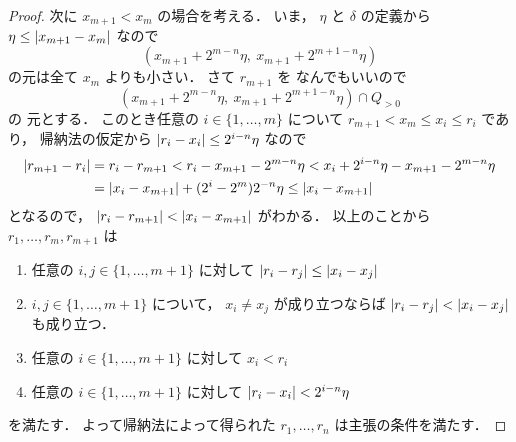 \documentclass[leqno, 12pt]{jsarticle}
\DeclarePairedDelimiter{\abs}{\lvert}{\rvert}
\newcommand{\pospart}[1]{#1_{>0}}
\begin{document}
\begin{proof}
次に%
$x_{m+1}<x_{m}$
の場合を考える．
いま，
$\eta$
と
$\delta$
の定義から
$\eta\le\abs{x_{m+1}-x_{m}}$
なので
\[
(x_{m+1}+2^{m-n}\eta, \  x_{m+1}+2^{m+1-n}\eta)
\]
の元は全て
$x_{m}$
よりも小さい．
さて
$r_{m+1}$
を
なんでもいいので
\[
(x_{m+1}+2^{m-n}\eta, \  x_{m+1}+2^{m+1-n}\eta)\cap \pospart{Q}
\]
の
元とする．
このとき任意の
$i\in \{1, \dots, m\}$
について
$r_{m+1}<x_{m}\le x_{i}\le r_{i}$
であり，
帰納法の仮定から
$\abs{r_{i}-x_{i}}\le 2^{i-n}\eta$
なので
\begin{align*}
\abs{r_{m+1}-r_{i}}
&=
r_{i}-r_{m+1}
< r_{i} - x_{m+1}-2^{m-n}\eta
< x_{i}+2^{i-n}\eta-x_{m+1}-2^{m-n}\eta\\
&=\abs{x_{i}-x_{m+1}}+(2^i-2^{m})2^{-n}\eta
\le \abs{x_{i}-x_{m+1}}
\end{align*}
となるので，
$\abs{r_{i}-r_{m+1}}<\abs{x_{i}-x_{m+1}}$
がわかる．
以上のことから
$r_{1}, \dots, r_{m}, r_{m+1}$
は
\begin{enumerate}[label=\textup{(\arabic*)}]
\item
任意の
$i, j\in \{1, \dots, m+1\}$
に対して
$\abs{r_{i}-r_{j}}\le \abs{x_{i}-x_{j}}$
\item
$i, j\in \{1, \dots, m+1\}$
について，
$x_{i}\neq x_{j}$%
が成り立つならば
$\abs{r_{i}-r_{j}}<\abs{x_{i}-x_{j}}$
も成り立つ．

\item
任意の
$i\in \{1, \dots, m+1\}$
に対して
$x_{i}<  r_{i}$
\item
任意の
$i\in \{1, \dots, m+1\}$
に対して
$\abs{r_{i}-x_{i}}<2^{i-n}\eta$
\end{enumerate}
を満たす．
よって帰納法によって得られた
$r_{1}, \dots, r_{n}$
は主張の条件を満たす．
\end{proof}
\end{document}
